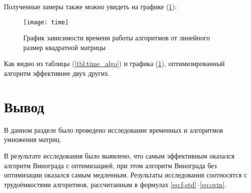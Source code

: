 Полученные замеры также можно увидеть на графике (\ref{fig:time_graph}):

\begin{figure}
	\centering
	\texttt{[image: time]}
	\caption{График зависимости времени работы алгоритмов от линейного размер квадратной матрицы}
	\label{fig:time_graph}
\end{figure}

Как видно из таблицы (\ref{tbl:time_algo}) и графика (\ref{fig:time_graph}), оптимизированный алгоритм эффективнее двух других.

\pagebreak

\section{Вывод}

В данном разделе было проведено исследование временных и алгоритмов умножения матриц.

В результате исследования было выявлено, что самым эффективным оказался алгоритм Винограда с оптимизацией, при этом алгоритм Винограда без оптимизации оказался самым медленным. Результаты исследования соотносятся с трудоёмкостями алгоритмов, рассчитанным в формулах \ref{eq:f-std}–\ref{eq:ovin}.

\clearpage
